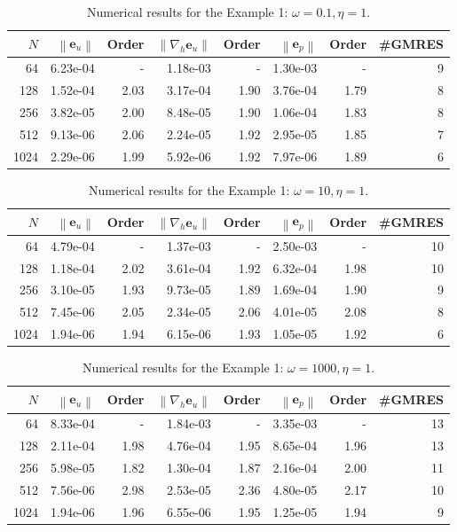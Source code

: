 \documentclass[preprint,11pt]{elsarticle}
\theoremstyle{remark}
\newcommand{\bm}[1]{\boldsymbol{#1}}
\newcommand{\norm}[1]{\left\lVert #1 \right\rVert}
\begin{document}
\begin{table}[htbp]
\centering
\caption{Numerical results for the Example 1: $\omega = 0.1, \eta = 1$.}
\label{tab:eg1-2}
\begin{tabular}{r r r r r r r r}
\hline
$N$ & $\norm{\bm e_u}$ & Order & $\norm{\nabla_h \bm e_u}$ & Order & $\norm{\bm e_p}$ & Order & \#GMRES \\
\hline
  64  & 6.23e-04 & - & 1.18e-03 & - & 1.30e-03 & - & 9 \\
 128  & 1.52e-04 & 2.03 & 3.17e-04 & 1.90 & 3.76e-04 & 1.79 & 8 \\
 256  & 3.82e-05 & 2.00 & 8.48e-05 & 1.90 & 1.06e-04 & 1.83 & 8 \\
 512  & 9.13e-06 & 2.06 & 2.24e-05 & 1.92 & 2.95e-05 & 1.85 & 7 \\
1024  & 2.29e-06 & 1.99 & 5.92e-06 & 1.92 & 7.97e-06 & 1.89 & 6 \\
\hline
\end{tabular}
\end{table}

\begin{table}[htbp]
\centering
\caption{Numerical results for the Example 1: $\omega = 10, \eta = 1$.}
\label{tab:eg1-3}
\begin{tabular}{r r r r r r r r}
\hline
$N$ & $\norm{\bm e_u}$ & Order & $\norm{\nabla_h \bm e_u}$ & Order & $\norm{\bm e_p}$ & Order & \#GMRES \\
\hline
  64  & 4.79e-04 & - & 1.37e-03 & - & 2.50e-03 & - & 10 \\
 128  & 1.18e-04 & 2.02 & 3.61e-04 & 1.92 & 6.32e-04 & 1.98 & 10 \\
 256  & 3.10e-05 & 1.93 & 9.73e-05 & 1.89 & 1.69e-04 & 1.90 &  9 \\
 512  & 7.45e-06 & 2.05 & 2.34e-05 & 2.06 & 4.01e-05 & 2.08 &  8 \\
1024  & 1.94e-06 & 1.94 & 6.15e-06 & 1.93 & 1.05e-05 & 1.92 &  6 \\
\hline
\end{tabular}
\end{table}

\begin{table}[htbp]
\centering
\caption{Numerical results for the Example 1: $\omega = 1000, \eta = 1$.}
\label{tab:eg1-4}
\begin{tabular}{r r r r r r r r}
\hline
$N$ & $\norm{\bm e_u}$ & Order & $\norm{\nabla_h \bm e_u}$ & Order & $\norm{\bm e_p}$ & Order & \#GMRES \\
\hline
  64  & 8.33e-04 & - & 1.84e-03 & - & 3.35e-03 & - & 13 \\
 128  & 2.11e-04 & 1.98 & 4.76e-04 & 1.95 & 8.65e-04 & 1.96 & 13 \\
 256  & 5.98e-05 & 1.82 & 1.30e-04 & 1.87 & 2.16e-04 & 2.00 & 11 \\
 512  & 7.56e-06 & 2.98 & 2.53e-05 & 2.36 & 4.80e-05 & 2.17 & 10 \\
1024  & 1.94e-06 & 1.96 & 6.55e-06 & 1.95 & 1.25e-05 & 1.94 &  9 \\
\hline
\end{tabular}
\end{table}
\end{document}
